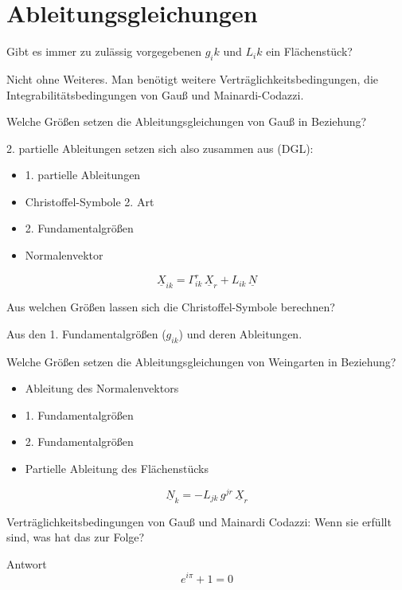 \documentclass[twocolumn, fontsize=8pt, DIV=1]{scrartcl}
\begin{document}
\section{Ableitungsgleichungen}


\begin{framed}
    Gibt es immer zu zulässig vorgegebenen $g_ik$ und $L_ik$ ein Flächenstück?
\end{framed}
Nicht ohne Weiteres. Man benötigt weitere Verträglichkeitsbedingungen, die Integrabilitätsbedingungen von Gauß und Mainardi-Codazzi.



\begin{framed}
    Welche Größen setzen die Ableitungsgleichungen von Gauß in Beziehung?
\end{framed}
2. partielle Ableitungen setzen sich also zusammen aus (DGL):
\begin{itemize}
    \item 1. partielle Ableitungen
    \item Christoffel-Symbole 2. Art
    \item 2. Fundamentalgrößen
    \item Normalenvektor
\end{itemize}
\[
    \underline{X}_{ik} = \Gamma_{ik}^r \, \underline{X}_r + L_{ik} \, \underline{N}
\]



\begin{framed}
    Aus welchen Größen lassen sich die Christoffel-Symbole berechnen?
\end{framed}
Aus den 1. Fundamentalgrößen ($g_{ik}$) und deren Ableitungen.



\begin{framed}
    Welche Größen setzen die Ableitungsgleichungen von Weingarten in Beziehung?
\end{framed}
\begin{itemize}
    \item Ableitung des Normalenvektors 
    \item 1. Fundamentalgrößen
    \item 2. Fundamentalgrößen
    \item Partielle Ableitung des Flächenstücks
\end{itemize}
\[
    \underline{N}_k = - L_{jk} \, g^{jr} \, \underline{X}_r
\]



\begin{framed}
    Verträglichkeitsbedingungen von Gauß und Mainardi Codazzi: Wenn sie erfüllt sind, was hat das zur Folge?
\end{framed}
Antwort
\[
    e^{i\pi} + 1 = 0
\]
\end{document}
